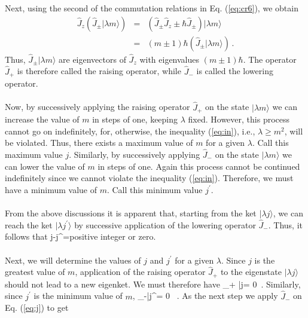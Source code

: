 Next, using the second of the commutation relations in Eq. (\ref{eq:cr6}), we obtain
\begin{eqnarray}
\hat{J}_z\left( \hat{J}_{\pm}|\lambda m\rangle \right) & = & (\hat{J}_{\pm}\hat{J}_z \pm \hbar \hat{J}_{\pm})|\lambda m\rangle
\nonumber \\
&= & (m\pm1)\hbar \left(\hat{J}_{\pm}|\lambda m\rangle \right)\, .
\end{eqnarray}
Thus, $\hat{J}_{\pm}|\lambda m\rangle$ are eigenvectors of $\hat{J}_z$ with eigenvalues $(m\pm 1)\hbar$. The operator 
$\hat{J}_{+}$ is therefore called the raising operator, while $\hat{J}_{-}$ is called the lowering operator.

\paragraph{}	
Now, by successively applying the raising operator $\hat{J}_{+}$ on the state $|\lambda m\rangle$ we can increase the
value of $m$ in steps of one, keeping $\lambda$ fixed. However, this process cannot go on indefinitely, for, otherwise, the inequality (\ref{eq:in}), 
i.e., $\lambda \geq m^2$, will be violated. Thus, there exists a maximum value of $m$ for a given $\lambda$. Call this maximum value $j$. Similarly, 
by successively applying $\hat{J}_{-}$ on the state $|\lambda m\rangle$ we can lower the value of $m$ in steps of one. Again this process cannot be continued indefinitely since we cannot violate the inequality (\ref{eq:in}). Therefore, we must have a minimum value of $m$. Call this minimum
value $j^{\prime}$.

\paragraph{}
From the above discussions it is apparent that, starting from the ket $|\lambda j\rangle$, we can reach the ket $|\lambda j^{\prime}\rangle$ by successive application of the lowering operator $\hat{J}_{-}$. Thus, it follows that
\be
j-j^{\prime}={\rm positive\; integer\; or\; zero}.
\label{eq:positiveinteger}
\ee

\paragraph{}
Next, we will determine the values of $j$ and $j^{\prime}$ for a given $\lambda$. Since $j$ is the greatest value of $m$, application of the raising operator $\hat{J}_{+}$ to the eigenstate $|\lambda j\rangle$ should not lead to
a new eigenket. We must therefore have
\be
{}_{+} |\lambda j\rangle = 0\, .
\label{eq:j}
\ee
Similarly, since $j^{\prime}$ is the minimum value of $m$,
\be 
{}_{-}|\lambda j^{\prime}\rangle = 0 \, .
\label{eq:jp}
\ee
As the next step we apply $\hat{J}_{-}$ on Eq. (\ref{eq:j}) to get

